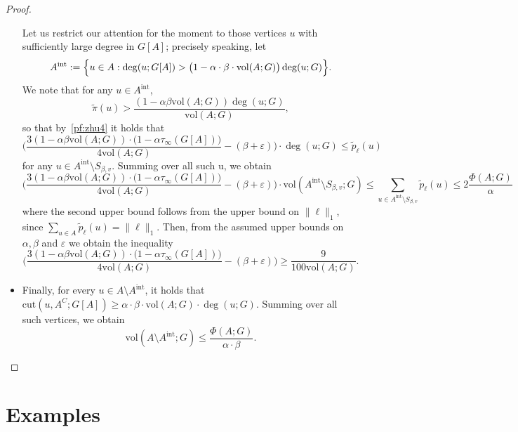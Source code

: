 \documentclass{report}
\newcommand{\vol}{\mathrm{vol}}
\newcommand{\1}{\mathbf{1}}
\newcommand{\wt}[1]{\widetilde{#1}}
\theoremstyle{alden}
\theoremstyle{aldenthm}
\theoremstyle{definition}
\theoremstyle{remark}
\begin{document}
\begin{proof}
\begin{itemize}
		Let us restrict our attention for the moment to those vertices $u$ with sufficiently large degree in $G[A]$; precisely speaking, let
		\begin{equation*}
		A^{\mathrm{int}} := \Bigl\{u \in A: \deg(u;G[A]) > \bigl(1 - \alpha \cdot \beta \cdot \vol(A;G)\bigr) \deg(u;G) \Bigr\}.
		\end{equation*}
		We note that for any $u \in A^{\mathrm{int}}$,
		\begin{equation*}
		\wt{\pi}(u) > \frac{(1 - \alpha \beta \vol(A;G))\deg(u;G)}{\vol(A;G)},
		\end{equation*}
		so that by~\eqref{pf:zhu4} it holds that
		\begin{equation*}
		\biggl(\frac{3(1 - \alpha \beta \vol(A;G))\cdot\bigl(1 - \alpha \tau_{\infty}(G[A])\bigr)}{4\vol(A;G)} - (\beta + \varepsilon)\biggr) \cdot \deg(u;G) \leq \wt{p}_{\ell}(u)
		\end{equation*}
		for any $u \in A^{\mathrm{int}} \setminus S_{\beta,v}$. Summing over all such u, we obtain
		\begin{equation*}
		\biggl(\frac{3(1 - \alpha \beta \vol(A;G))\cdot\bigl(1 - \alpha \tau_{\infty}(G[A])\bigr)}{4\vol(A;G)} - (\beta + \varepsilon)\biggr) \cdot \vol(A^{\mathrm{int}} \setminus S_{\beta,v}; G) \leq \sum_{u \in A^{\mathrm{int}} \setminus S_{\beta,v}} \wt{p}_{\ell}(u) \leq 2\frac{\Phi(A;G)}{\alpha}
		\end{equation*}
		where the second upper bound follows from the upper bound on $\|\ell\|_1$, since $\sum_{u \in A} \wt{p}_{\ell}(u) = \|\ell\|_1$. 
		Then, from the assumed upper bounds on $\alpha, \beta$ and $\varepsilon$ we obtain the inequality
		\begin{equation*}
		\biggl(\frac{3(1 - \alpha \beta \vol(A;G))\cdot\bigl(1 - \alpha \tau_{\infty}(G[A])\bigr)}{4\vol(A;G)} - (\beta + \varepsilon)\biggr) \geq \frac{9}{100\vol(A;G)}.
		\end{equation*}
		\item Finally, for every $u \in A \setminus A^{\mathrm{int}} $, it holds that $\mathrm{cut}(u, A^C;G[A]) \geq \alpha \cdot \beta \cdot \vol(A;G) \cdot \deg(u;G)$. Summing over all such vertices, we obtain
		\begin{equation*}
		\vol(A \setminus A^{\mathrm{int}};G) \leq \frac{\Phi(A;G)}{\alpha \cdot \beta}.
		\end{equation*}	
	\end{itemize}
\end{proof}

\chapter{Examples}
\end{document}
